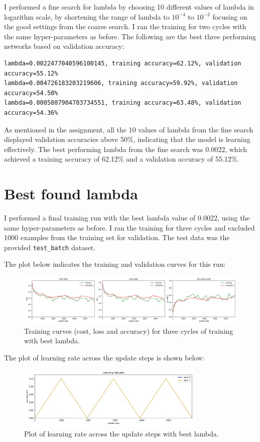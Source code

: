 \documentclass[11pt]{article}
\begin{document}
I performed a fine search for lambda by choosing 10 different values of lambda in logarithm scale, by shortening the range of lambda to $10^{-4}$ to $10^{-2}$ focusing on the good settings from the coarse search.
I ran the training for two cycles with the same hyper-parameters as before.
The following are the best three performing networks based on validation accuracy:
\begin{lstlisting}[caption={Fine search for lambda}, label={lst:fine_search}]
lambda=0.0022477040596100145, training accuracy=62.12%, validation accuracy=55.12%
lambda=0.004726183203219606, training accuracy=59.92%, validation accuracy=54.50%
lambda=0.0005807904703734551, training accuracy=63.48%, validation accuracy=54.36%
\end{lstlisting}

As mentioned in the assignment, all the 10 values of lambda from the fine search displayed validation accuracies above 50\%, indicating that the model is learning effectively.
The best performing lambda from the fine search was 0.0022, which achieved a training accuracy of 62.12\% and a validation accuracy of 55.12\%.

\section*{Best found lambda}
I performed a final training run with the best lambda value of 0.0022, using the same hyper-parameters as before.
I ran the training for three cycles and excluded 1000 examples from the training set for validation.
The test data was the provided \texttt{test\_batch} dataset. 

The plot below indicates the training and validation curves for this run:
\begin{figure}[H]
    \centering
    \includegraphics[width=1\textwidth]{cyclic_training_curves_ex5.jpg}
    \caption{Training curves (cost, loss and accuracy) for three cycles of training with best lambda.}
    \label{fig:best_lambda_curves}
\end{figure}

The plot of learning rate across the update steps is shown below:
\begin{figure}[H]
    \centering
    \includegraphics[width=0.8\textwidth]{cyclic_eta3.jpg}
    \caption{Plot of learning rate across the update steps with best lambda.}
    \label{fig:best_lambda_eta}
\end{figure}
\end{document}
